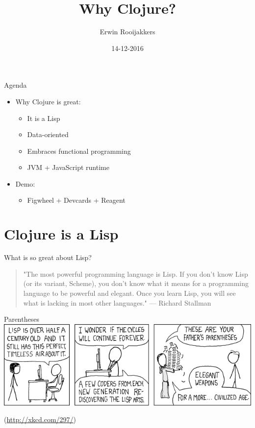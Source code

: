 \documentclass[presentation]{beamer}
\author{Erwin Rooijakkers}
\date{14-12-2016}
\title{Why Clojure?}
\begin{document}
\maketitle

\begin{frame}[label={sec:orgheadline1}]{Agenda}
\begin{itemize}
\item Why Clojure is great:
\begin{itemize}
\item It is a Lisp
\item Data-oriented
\item Embraces functional programming
\item JVM + JavaScript runtime
\end{itemize}
\item Demo:
\begin{itemize}
\item Figwheel + Devcards + Reagent
\end{itemize}
\end{itemize}
\end{frame}

\section{Clojure is a Lisp}
\label{sec:orgheadline8}

\begin{frame}[label={sec:orgheadline2}]{What is so great about Lisp?}
\begin{quotation}
"The most powerful programming language is Lisp. If you don't know Lisp (or its variant, Scheme), you don't know what it means for a programming language to be powerful and elegant. Once you learn Lisp, you will see what is lacking in most other languages." --- Richard Stallman
\end{quotation}
\end{frame}

\begin{frame}[label={sec:orgheadline3}]{Parentheses}
\includegraphics[width=.9\linewidth]{../images/lisp_cycles.png}

(\url{http://xkcd.com/297/})
\end{frame}
\end{document}
